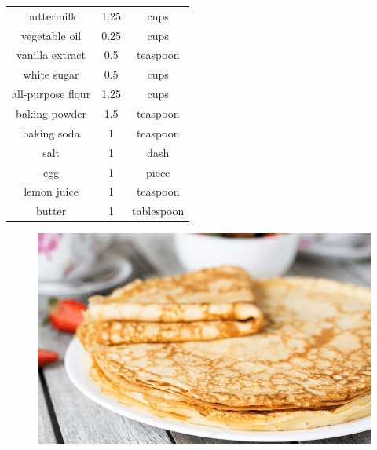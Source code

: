 \documentclass[12pt]{article}
\begin{document}
\centering

\begin{tabular}{|c|c|c|}
\hline
buttermilk & 1.25 & cups \\
vegetable oil & 0.25 & cups \\
vanilla extract & 0.5 & teaspoon \\
white sugar & 0.5 & cups \\
all-purpose flour & 1.25 & cups \\
baking powder & 1.5 & teaspoon \\
baking soda & 1 & teaspoon \\
salt & 1 & dash \\
egg & 1 & piece \\
lemon juice & 1 & teaspoon \\
butter & 1 & tablespoon \\
\hline
\end{tabular}

\begin{figure}[h]
\centering
\includegraphics[max width=\textwidth,max height=\textheight]{example.png}
\end{figure}
\end{document}
